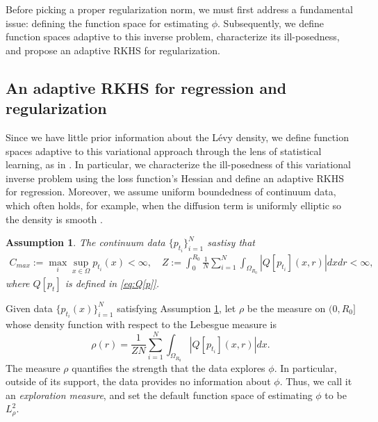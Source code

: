 \documentclass[12pt]{article}
\numberwithin{equation}{section}
\numberwithin{theorem}{section}
\newtheorem{assumption}{Assumption}
\begin{document}
Before picking a proper regularization norm, we must first address a fundamental issue: defining the function space for estimating $\phi$. Subsequently, we define function spaces adaptive to this inverse problem, characterize its ill-posedness, and propose an adaptive RKHS for regularization. 

\subsection{An adaptive RKHS for regression and regularization}

Since we have little prior information about the L\'evy density, we define function spaces adaptive to this variational approach through the lens of statistical learning, as in \cite{lu2023nonparametric,lu2022data,lang2022learning}. In particular, we characterize the ill-posedness of this variational inverse problem using the loss function's Hessian and define an adaptive RKHS for regression. Moreover, we assume uniform boundedness of continuum data, which often holds, for example, when the diffusion term is uniformly elliptic so the density is smooth \cite{chen2017heat}.


\begin{assumption}\label{assump:data}  
The continuum data $\{p_{t_i}\}_{i=1}^N$ sastisy that  
 \begin{equation}
 \begin{aligned}
 C_{max}:=  \max_{i} \sup_{x\in \Omega} p_{t_i}(x) <\infty, \quad 
 Z      := \int_0^{R_0} \frac{1}{N} \sum_{i=1}^N \int_{\Omega_{R_0}} \left|Q[p_{t_i}](x,r)\right| d x d r<\infty, 
 \end{aligned}
 \end{equation}
 where $Q[p_t]$ is defined in \eqref{eq:Q[p]}. 
\end{assumption}


Given data $\{p_{t_i}(x)\}_{i=1}^N$ satisfying {\rm Assumption \ref{assump:data}}, let $\rho$ be the measure on $(0,R_0]$ whose density function with respect to the Lebesgue measure is  
\begin{equation} \label{eq:rho}
   \rho(r)= \frac{1}{Z N} \sum_{i=1}^N \int_{\Omega_{R_0}} \left|Q[p_{t_i}](x,r)\right| d x. 
 \end{equation}
The measure $\rho$ quantifies the strength that the data explores $\phi$. In particular, outside of its support, the data provides no information about $\phi$. Thus, we call it an \emph{exploration measure}, and set the default function space of estimating $\phi$ to be $L^2_\rho$. 
\end{document}
